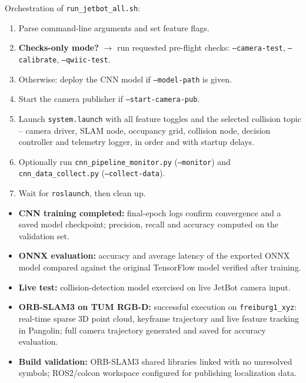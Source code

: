 {
	Orchestration of \texttt{run\_jetbot\_all.sh}:
	\begin{enumerate}
		\item Parse command-line arguments and set feature flags.
		\item \textbf{Checks-only mode?} $\rightarrow$ run requested pre-flight checks: \texttt{--camera-test}, \texttt{--calibrate}, \texttt{--qwiic-test}.
		\item Otherwise: deploy the CNN model if \texttt{--model-path} is given.
		\item Start the camera publisher if \texttt{--start-camera-pub}.
		\item Launch \texttt{system.launch} with all feature toggles and the selected collision topic -- camera driver, SLAM node, occupancy grid, collision node, decision controller and telemetry logger, in order and with startup delays.
		\item Optionally run \texttt{cnn\_pipeline\_monitor.py} (\texttt{--monitor}) and \texttt{cnn\_data\_collect.py} (\texttt{--collect-data}).
		\item Wait for \texttt{roslaunch}, then clean up.
	\end{enumerate}
}
{
	\begin{itemize}
		\item \textbf{CNN training completed:} final-epoch logs confirm convergence and a saved model checkpoint; precision, recall and accuracy computed on the validation set.
		\item \textbf{ONNX evaluation:} accuracy and average latency of the exported ONNX model compared against the original TensorFlow model verified after training.
		\item \textbf{Live test:} collision-detection model exercised on live JetBot camera input.
		\item \textbf{ORB-SLAM3 on TUM RGB-D:} successful execution on \texttt{freiburg1\_xyz}: real-time sparse 3D point cloud, keyframe trajectory and live feature tracking in Pangolin; full camera trajectory generated and saved for accuracy evaluation.
		\item \textbf{Build validation:} ORB-SLAM3 shared libraries linked with no unresolved symbols; ROS2/colcon workspace configured for publishing localization data.
	\end{itemize}
}

